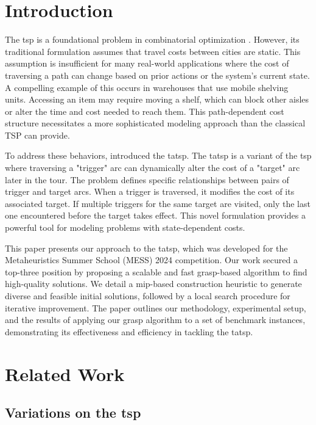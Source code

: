 \documentclass[twocolumn, switch]{article} %
\begin{document}
\section{Introduction}
The \gls{tsp} is a foundational problem in combinatorial optimization \cite{Applegate2011}. 
However, its traditional formulation assumes that travel costs between cities are static. 
This assumption is insufficient for many real-world applications where the cost of traversing a path can change based on prior actions or the system's current state.
A compelling example of this occurs in warehouses that use mobile shelving units. Accessing an item may require moving a shelf, which can block other aisles or alter the time and cost needed to reach them. This path-dependent cost structure necessitates a more sophisticated modeling approach than the classical TSP can provide.

To address these behaviors, \citet{Cerrone} introduced the \gls{tatsp}. 
The \gls{tatsp} is a variant of the \gls{tsp} where traversing a "trigger" arc can dynamically alter the cost of a "target" arc later in the tour. 
The problem defines specific relationships between pairs of trigger and target arcs. 
When a trigger is traversed, it modifies the cost of its associated target. 
If multiple triggers for the same target are visited, only the last one encountered before the target takes effect. 
This novel formulation provides a powerful tool for modeling problems with state-dependent costs.

This paper presents our approach to the \gls{tatsp}, which was developed for the Metaheuristics Summer School (MESS) 2024 competition. 
Our work secured a top-three position by proposing a scalable and fast \gls{grasp}-based algorithm to find high-quality solutions. 
We detail a \gls{mip}-based construction heuristic to generate diverse and feasible initial solutions, followed by a local search procedure for iterative improvement. 
The paper outlines our methodology, experimental setup, and the results of applying our \gls{grasp} algorithm to a set of benchmark instances, demonstrating its effectiveness and efficiency in tackling the \gls{tatsp}.

\section{Related Work}
\label{sec:related_work}

\subsection{Variations on the \gls{tsp}}
\end{document}
